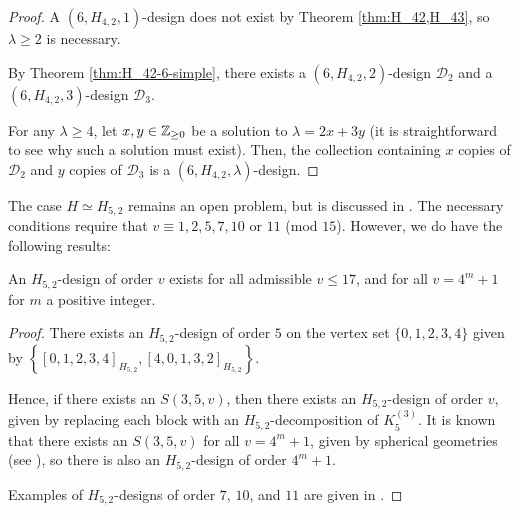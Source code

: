 \begin{proof}
A $(6, H_{4,2}, 1)$-design does not exist by Theorem \ref{thm:H_42,H_43}, so $\lambda \geq 2$ is necessary.

By Theorem \ref{thm:H_42-6-simple}, there exists a $(6, H_{4,2}, 2)$-design $\mathcal{D}_2$ and a $(6, H_{4,2}, 3)$-design $\mathcal{D}_3$.

For any $\lambda \geq 4$, let $x, y \in \mathbb{Z}_{\geq 0}$ be a solution to $\lambda = 2x + 3y$
  (it is straightforward to see why such a solution must exist).
Then, the collection containing $x$ copies of $\mathcal{D}_2$ and $y$ copies of $\mathcal{D}_3$ is a $(6, H_{4,2}, \lambda)$-design.
\end{proof}




The case $H \simeq H_{5,2}$ remains an open problem, but is discussed in \cite{mesz-rosa}.
The necessary conditions require that $v \equiv 1, 2, 5, 7, 10$ or $11$ (mod $15$).
However, we do have the following results:

\begin{theorem} \label{thm:H_52}
An $H_{5,2}$-design of order $v$ exists for all admissible $v \leq 17$, and for
all $v = 4^m + 1$ for $m$ a positive integer.
\end{theorem}

\begin{proof}
There exists an $H_{5,2}$-design of order $5$ on the vertex set $\{0,1,2,3,4\}$
  given by $\left\{[0,1,2,3,4]_{H_{5,2}}, [4, 0, 1, 3, 2]_{H_{5,2}} \right\}$.

Hence, if there exists an $S(3, 5, v)$, then there exists an $H_{5,2}$-design of order $v$, given by replacing each block with an $H_{5,2}$-decomposition of $K_5^{(3)}$.
It is known that there exists an $S(3, 5, v)$ for all $v = 4^m+1$, given by spherical geometries (see \cite{khos-laue}), so there is also an $H_{5,2}$-design of order $4^m+1$.

Examples of $H_{5,2}$-designs of order $7$, $10$, and $11$ are given in \cite{mesz-rosa}.
\end{proof}
